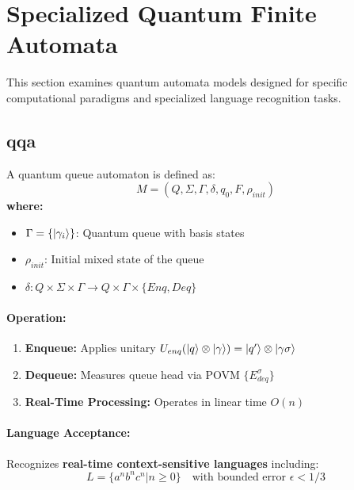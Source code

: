 \section{Specialized Quantum Finite Automata}
\label{sec:specialized-qfa}

This section examines quantum automata models designed for specific computational paradigms and specialized language recognition tasks.

\subsection{\acrfull{qqa}}
\label{subsec:qqa}

\begin{definition}
A quantum queue automaton is defined as:
\[
M = (Q, \Sigma, \Gamma, \delta, q_0, F, \rho_{init})
\]
\textbf{where:}
\begin{itemize}
    \item $\Gamma = \{\ket{\gamma_i}\}$: Quantum queue with basis states
    \item $\rho_{init}$: Initial mixed state of the queue
    \item $\delta: Q \times \Sigma \times \Gamma \rightarrow Q \times \Gamma \times \{Enq, Deq\}$
\end{itemize}
\end{definition}

\paragraph{Operation:}
\begin{enumerate}
    \item \textbf{Enqueue:} Applies unitary $U_{enq}(\ket{q}\otimes\ket{\gamma}) = \ket{q'}\otimes\ket{\gamma\sigma}$
    \item \textbf{Dequeue:} Measures queue head via POVM $\{E_{deq}^\sigma\}$
    \item \textbf{Real-Time Processing:} Operates in linear time $O(n)$ \cite{yakaryilmaz2010succinctness}
\end{enumerate}

\paragraph{Language Acceptance:}
Recognizes \textbf{real-time context-sensitive languages} including:
\[
L = \{a^nb^nc^n | n \geq 0\} \quad \text{with bounded error } \epsilon < 1/3
\]

